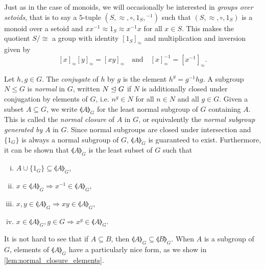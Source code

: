 Just as in the case of monoids, we will occasionally be interested in \emph{groups over setoids},
that is to say a $5$-tuple
$(S, \approx, \circ, 1_S, {}^{-1})$ such that $(S, \approx, \circ, 1_S)$ is a monoid over a
setoid and $xx^{-1} \approx 1_S \approx x^{-1}x$ for all $x\in S$. This makes the quotient
$S/{\cong}$ a group with identity ${[1_S]}_\approx$ and multiplication and inversion given by
\[
  {[x]}_\approx {[y]}_{\approx} = {[xy]}_\approx \quad \textrm{and} \quad
  {[x]}_\approx^{-1} = {[x^{-1}]}_\approx.
\]

Let $h, g\in G$. The \emph{conjugate} of $h$ by $g$ is the element $h^g = g^{-1}hg$.
A subgroup $N\leq G$ is \emph{normal} in $G$, written $N \trianglelefteq G$ if $N$ is additionally
closed under conjugation by elements of $G$, i.e. $n^g \in N$ for all $n\in N$ and all $g\in G$.
Given a subset $A \subseteq G$, we write $\llangle A \rrangle_G$ for the least normal subgroup of
$G$ containing $A$. This is called the \emph{normal closure} of $A$ in $G$, or equivalently the
\emph{normal subgroup generated by} $A$ in $G$. Since normal subgroups are closed under
intersection and $\{1_G\}$ is always a normal subgroup of $G$, $\llangle A\rrangle_G$ is
guaranteed to exist. Furthermore, it can be shown that $\llangle A\rrangle_G$ is the least subset of $G$ such that
\begin{enumerate}[(i)]
  \item $A \cup \{1_G\}\subseteq \llangle A\rrangle_G$,
  \item $x \in \llangle A\rrangle_G \Rightarrow x^{-1} \in \llangle A \rrangle_G$,
  \item $x, y \in \llangle A\rrangle_G \Rightarrow xy \in \llangle A \rrangle_G$,
  \item $x \in \llangle A\rrangle_G, g\in G \Rightarrow x^g \in \llangle A \rrangle_G$.
\end{enumerate}
It is not hard to see that if $A\subseteq B$, then $\llangle A \rrangle_G \subseteq \llangle B
\rrangle_G$. When $A$ is a subgroup of $G$, elements of $\llangle A \rrangle_G$ have a
particularly nice form, as we show in \cref{lem:normal_closure_elements}.

